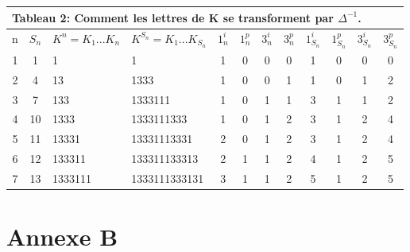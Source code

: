 \documentclass[12pt,a4paper,oneside]{book}
\begin{document}
\begin{titlepage}
\section*{}
\begin{center}
\begin{tabular}{||c||c||l||l||c|c|c|c||c|c|c|c||}
\multicolumn{12}{l}{Tableau 2: Comment les lettres de K se transforment par $\Delta^{-1}$.} \\
\hline \hline 
n & $S_n$ & $K^n=K_1...K_n$ & $K^{S_n}=K_1...K_{S_n}$ & $1_n^i$ & $1_n^p$ & $3_n^i$ & $3_n^p$ & $1_{S_n}^i$ & $1_{S_n}^p$ & $3_{S_n}^i$ & $3_{S_n}^p$ \\ 
\hline \hline
1 & 1 & 1 & 1 & 1 & 0 & 0 & 0 & 1 & 0 & 0 & 0 \\ 
\hline 
2 & 4 & 13 & 1333 & 1 & 0 & 0 & 1 & 1 & 0 & 1 & 2 \\ 
\hline 
3 & 7 & 133 & 1333111 & 1 & 0 & 1 & 1 & 3 & 1 & 1 & 2 \\ 
\hline 
4 & 10 & 1333 & 1333111333 & 1 & 0 & 1 & 2 & 3 & 1 & 2 & 4 \\ 
\hline 
5 & 11 & 13331 & 13331113331 & 2 & 0 & 1 & 2 & 3 & 1 & 2 & 4 \\ 
\hline 
6 & 12 & 133311 & 133311133313 & 2 & 1 & 1 & 2 & 4 & 1 & 2 & 5 \\ 
\hline 
7 & 13 & 1333111 & 1333111333131 & 3 & 1 & 1 & 2 & 5 & 1 & 2 & 5 \\ 
\hline \hline
\end{tabular} 
\end{center}
\chapter*{Annexe B}

\end{titlepage}
\end{document}
